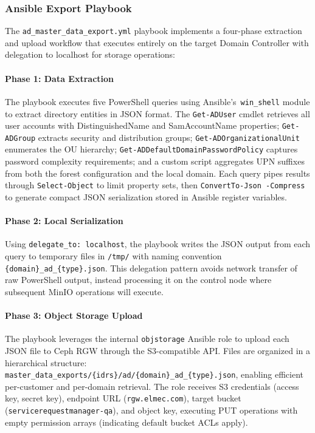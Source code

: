 \subsubsection{Ansible Export Playbook}

The \texttt{ad\_master\_data\_export.yml} playbook implements a four-phase extraction and upload workflow that executes entirely on the target Domain Controller with delegation to localhost for storage operations:

\paragraph{Phase 1: Data Extraction}
The playbook executes five PowerShell queries using Ansible's~\texttt{win\_shell} module to extract directory entities in JSON format. The \texttt{Get-ADUser} cmdlet retrieves all user accounts with DistinguishedName and SamAccountName properties; \texttt{Get-ADGroup} extracts security and distribution groups; \texttt{Get-ADOrganizationalUnit} enumerates the OU hierarchy; \texttt{Get-ADDefaultDomainPasswordPolicy} captures password complexity requirements; and a custom script aggregates UPN suffixes from both the forest configuration and the local domain. Each query pipes results through \texttt{Select-Object} to limit property sets, then \texttt{ConvertTo-Json -Compress} to generate compact JSON serialization stored in Ansible register variables.

\paragraph{Phase 2: Local Serialization}
Using \texttt{delegate\_to: localhost}, the playbook writes the JSON output from each query to temporary files in \texttt{/tmp/} with naming convention \texttt{\{domain\}\_ad\_\{type\}.json}. This delegation pattern avoids network transfer of raw PowerShell output, instead processing it on the control node where subsequent MinIO operations will execute.

\paragraph{Phase 3: Object Storage Upload}
The playbook leverages the internal \texttt{objstorage} Ansible role to upload each JSON file to Ceph RGW through the S3-compatible API. Files are organized in a hierarchical structure: \texttt{master\_data\_exports/\{idrs\}/ad/\{domain\}\_ad\_\{type\}.json}, enabling efficient per-customer and per-domain retrieval. The role receives S3 credentials (access key, secret key), endpoint URL (\texttt{rgw.elmec.com}), target bucket (\texttt{servicerequestmanager-qa}), and object key, executing PUT operations with empty permission arrays (indicating default bucket ACLs apply).

